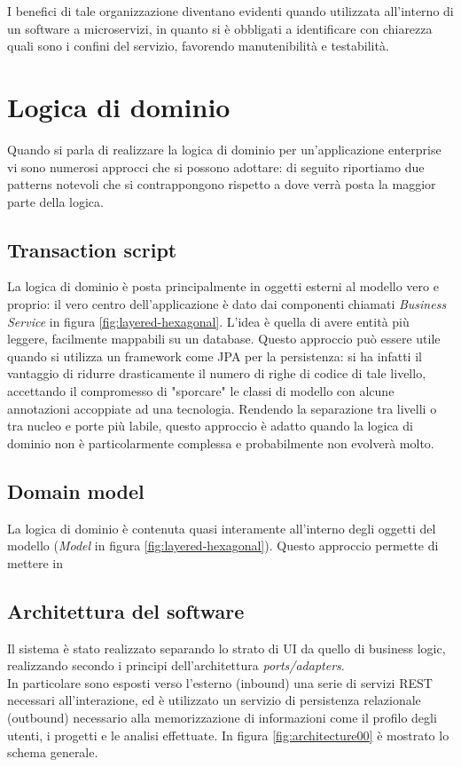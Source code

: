 I benefici di tale organizzazione diventano evidenti quando utilizzata all'interno di un software a microservizi, in quanto si è obbligati a identificare con chiarezza quali sono i confini del servizio, favorendo manutenibilità e testabilità.

\section{Logica di dominio}

Quando si parla di realizzare la logica di dominio per un'applicazione enterprise vi sono numerosi approcci che si possono adottare: di seguito riportiamo due patterns notevoli\cite{enterprise_app} che si contrappongono rispetto a dove verrà posta la maggior parte della logica.

\subsection{Transaction script}
La logica di dominio è posta principalmente in oggetti esterni al modello vero e proprio: il vero centro dell'applicazione è dato dai componenti chiamati \textit{Business Service} in figura \ref{fig:layered-hexagonal}.
L'idea è quella di avere entità più leggere, facilmente mappabili su un database.
Questo approccio può essere utile quando si utilizza un framework come JPA per la persistenza: si ha infatti il vantaggio di ridurre drasticamente il numero di righe di codice di tale livello, accettando il compromesso di "sporcare" le classi di modello con alcune annotazioni accoppiate ad una tecnologia.
Rendendo la separazione tra livelli o tra nucleo e porte più labile, questo approccio è adatto quando la logica di dominio non è particolarmente complessa e probabilmente non evolverà molto.

\subsection{Domain model}
La logica di dominio è contenuta quasi interamente all'interno degli oggetti del modello (\textit{Model} in figura \ref{fig:layered-hexagonal}).
Questo approccio permette di mettere in

\subsection{Architettura del software}
Il sistema è stato realizzato separando lo strato di UI da quello di business logic, realizzando secondo i principi dell'architettura \textit{ports/adapters}.\\
In particolare sono esposti verso l'esterno (inbound) una serie di servizi REST necessari all'interazione, ed è utilizzato un servizio di persistenza relazionale (outbound) necessario alla memorizzazione di informazioni come il profilo degli utenti, i progetti e le analisi effettuate.
In figura \ref{fig:architecture00} è mostrato lo schema generale.

